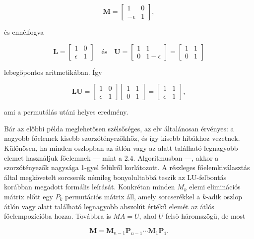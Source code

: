 \documentclass[
  magyar,
  11pt]{article}
\providecommand{\boldsymbol}[1]{\mathbf{#1}}
\begin{document}
\[\boldsymbol{M} = \begin{bmatrix} 1 & 0 \\ -\epsilon & 1 \end{bmatrix},\]

és ennélfogva

\[\boldsymbol{L} = \begin{bmatrix} 1 & 0 \\ \epsilon & 1 \end{bmatrix} \quad \text{és} \quad \boldsymbol{U} = \begin{bmatrix} 1 & 1 \\ 0 & 1 - \epsilon \end{bmatrix} = \begin{bmatrix} 1 & 1 \\ 0 & 1 \end{bmatrix}\]

lebegőpontos aritmetikában. Így

\[\boldsymbol{L}\boldsymbol{U} = \begin{bmatrix} 1 & 0 \\ \epsilon & 1 \end{bmatrix} \begin{bmatrix} 1 & 1 \\ 0 & 1 \end{bmatrix} = \begin{bmatrix} 1 & 1 \\ \epsilon & 1 \end{bmatrix},\]

ami a permutálás utáni helyes eredmény.

Bár az előbbi példa meglehetősen szélsőséges, az elv általánosan
érvényes: a nagyobb főelemek kisebb szorzótényezőkhöz, és így kisebb
hibákhoz vezetnek. Különösen, ha minden oszlopban az átlón vagy az alatt
található legnagyobb elemet használjuk főelemnek --- mint a 2.4.
Algoritmusban ---, akkor a szorzótényezők nagysága 1-gyel felülről
korlátozott. A részleges főelemkiválasztás által megkövetelt sorcserék
némileg bonyolultabbá teszik az LU-felbontás korábban megadott formális
leírását. Konkrétan minden \(M_k\) elemi eliminációs mátrix előtt egy
\(P_k\) permutációs mátrix áll, amely sorcserékkel a \(k\)-adik oszlop
átlón vagy alatt található legnagyobb abszolút értékű elemét az átlós
főelempozícióba hozza. Továbbra is \(MA = U\), ahol \(U\) felső
háromszögű, de most

\[\boldsymbol{M} = \boldsymbol{M}_{n-1} \boldsymbol{P}_{n-1} \cdots \boldsymbol{M}_1 \boldsymbol{P}_1.\]
\end{document}
